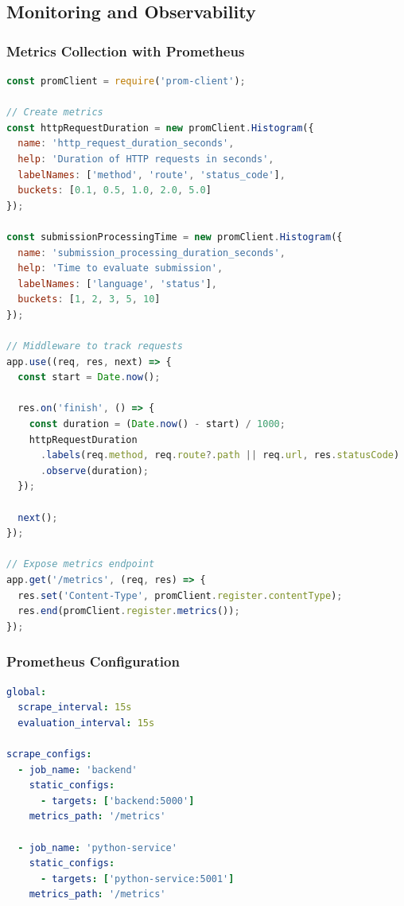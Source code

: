 \documentclass[12pt,a4paper,oneside]{article}
\begin{document}
{{\subsection{Monitoring and Observability}

\subsubsection{Metrics Collection with Prometheus}

\begin{lstlisting}[language=JavaScript, caption=Backend Metrics Export]
const promClient = require('prom-client');

// Create metrics
const httpRequestDuration = new promClient.Histogram({
  name: 'http_request_duration_seconds',
  help: 'Duration of HTTP requests in seconds',
  labelNames: ['method', 'route', 'status_code'],
  buckets: [0.1, 0.5, 1.0, 2.0, 5.0]
});

const submissionProcessingTime = new promClient.Histogram({
  name: 'submission_processing_duration_seconds',
  help: 'Time to evaluate submission',
  labelNames: ['language', 'status'],
  buckets: [1, 2, 3, 5, 10]
});

// Middleware to track requests
app.use((req, res, next) => {
  const start = Date.now();
  
  res.on('finish', () => {
    const duration = (Date.now() - start) / 1000;
    httpRequestDuration
      .labels(req.method, req.route?.path || req.url, res.statusCode)
      .observe(duration);
  });
  
  next();
});

// Expose metrics endpoint
app.get('/metrics', (req, res) => {
  res.set('Content-Type', promClient.register.contentType);
  res.end(promClient.register.metrics());
});
\end{lstlisting}

\subsubsection{Prometheus Configuration}

\begin{lstlisting}[language=YAML, caption=prometheus.yml]
global:
  scrape_interval: 15s
  evaluation_interval: 15s

scrape_configs:
  - job_name: 'backend'
    static_configs:
      - targets: ['backend:5000']
    metrics_path: '/metrics'
  
  - job_name: 'python-service'
    static_configs:
      - targets: ['python-service:5001']
    metrics_path: '/metrics'
  

\end{lstlisting}}}
\end{document}
